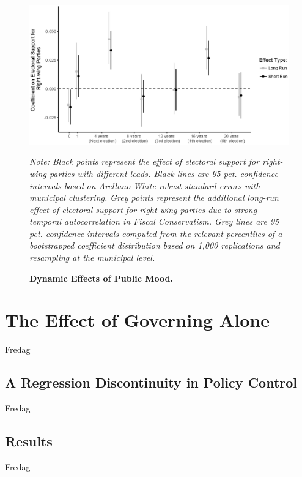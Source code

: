 \documentclass[a4paper,12pt]{article}
\newcommand\fnote[1]{\captionsetup{font=small}\caption*{#1}}
\begin{document}
\begin{figure}[h]
	\centering
	\includegraphics[scale = .8]{coef_on_varying_leads.eps}
	\caption{\textbf{Dynamic Effects of Public Mood.}} \fnote{\emph{Note: Black points represent the effect of electoral support for right-wing parties with different leads. Black lines are 95 pct. confidence intervals based on Arellano-White robust standard errors with municipal clustering. Grey points represent the additional long-run effect of electoral support for right-wing parties due to strong temporal autocorrelation in Fiscal Conservatism. Grey lines are 95 pct. confidence intervals computed from the relevant percentiles of a bootstrapped coefficient distribution based on 1,000 replications and resampling at the municipal level.}}
	\label{fig:LongRun}
\end{figure}



\section{The Effect of Governing Alone}

Fredag

\subsection{A Regression Discontinuity in Policy Control}


Fredag

\subsection{Results}

Fredag
\end{document}
